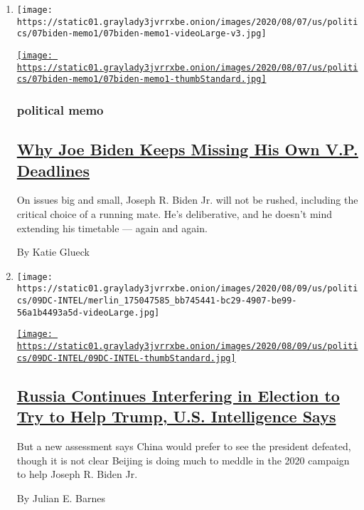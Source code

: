 \begin{enumerate}
\def\labelenumi{\arabic{enumi}.}
\item
  \texttt{[image: https://static01.graylady3jvrrxbe.onion/images/2020/08/07/us/politics/07biden-memo1/07biden-memo1-videoLarge-v3.jpg]}

  \href{/2020/08/07/us/politics/joe-biden-vice-presidential-search.html}{\texttt{[image: https://static01.graylady3jvrrxbe.onion/images/2020/08/07/us/politics/07biden-memo1/07biden-memo1-thumbStandard.jpg]}}

  \hypertarget{political-memo}{%
  \subsubsection{political memo}\label{political-memo}}

  \hypertarget{why-joe-biden-keeps-missing-his-own-vp-deadlines}{%
  \subsection{\texorpdfstring{\href{/2020/08/07/us/politics/joe-biden-vice-presidential-search.html}{Why
  Joe Biden Keeps Missing His Own V.P.
  Deadlines}}{Why Joe Biden Keeps Missing His Own V.P. Deadlines}}\label{why-joe-biden-keeps-missing-his-own-vp-deadlines}}

  On issues big and small, Joseph R. Biden Jr. will not be rushed,
  including the critical choice of a running mate. He's deliberative,
  and he doesn't mind extending his timetable --- again and again.

  By Katie Glueck
\item
  \texttt{[image: https://static01.graylady3jvrrxbe.onion/images/2020/08/09/us/politics/09DC-INTEL/merlin\_175047585\_bb745441-bc29-4907-be99-56a1b4493a5d-videoLarge.jpg]}

  \href{/2020/08/07/us/politics/russia-china-trump-biden-election-interference.html}{\texttt{[image: https://static01.graylady3jvrrxbe.onion/images/2020/08/09/us/politics/09DC-INTEL/09DC-INTEL-thumbStandard.jpg]}}

  \hypertarget{russia-continues-interfering-in-election-to-try-to-help-trump-us-intelligence-says}{%
  \subsection{\texorpdfstring{\href{/2020/08/07/us/politics/russia-china-trump-biden-election-interference.html}{Russia
  Continues Interfering in Election to Try to Help Trump, U.S.
  Intelligence
  Says}}{Russia Continues Interfering in Election to Try to Help Trump, U.S. Intelligence Says}}\label{russia-continues-interfering-in-election-to-try-to-help-trump-us-intelligence-says}}

  But a new assessment says China would prefer to see the president
  defeated, though it is not clear Beijing is doing much to meddle in
  the 2020 campaign to help Joseph R. Biden Jr.

  By Julian E. Barnes
\end{enumerate}

